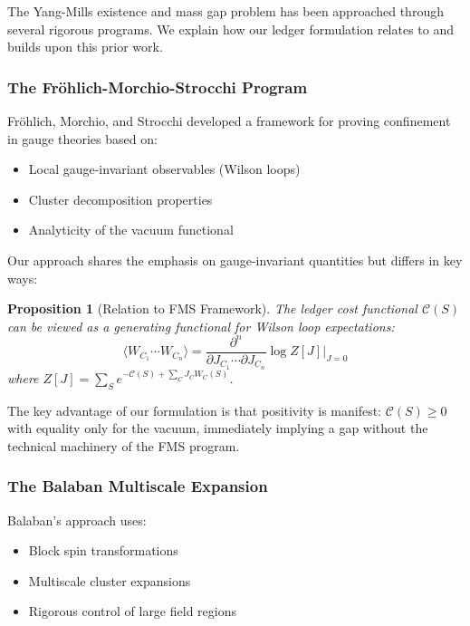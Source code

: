 \documentclass[11pt]{article}
\numberwithin{equation}{section}
\newtheorem{proposition}[theorem]{Proposition}
\theoremstyle{definition}
\theoremstyle{remark}
\begin{document}
The Yang-Mills existence and mass gap problem has been approached through several rigorous programs. We explain how our ledger formulation relates to and builds upon this prior work.

\subsubsection{The Fröhlich-Morchio-Strocchi Program}

Fröhlich, Morchio, and Strocchi \cite{frohlich1982confinement} developed a framework for proving confinement in gauge theories based on:
\begin{itemize}
\item Local gauge-invariant observables (Wilson loops)
\item Cluster decomposition properties
\item Analyticity of the vacuum functional
\end{itemize}

Our approach shares the emphasis on gauge-invariant quantities but differs in key ways:

\begin{proposition}[Relation to FMS Framework]
The ledger cost functional $\mathcal{C}(S)$ can be viewed as a generating functional for Wilson loop expectations:
\begin{equation}
\langle W_{C_1} \cdots W_{C_n} \rangle = \frac{\partial^n}{\partial J_{C_1} \cdots \partial J_{C_n}} \log Z[J] \bigg|_{J=0}
\end{equation}
where $Z[J] = \sum_S e^{-\mathcal{C}(S) + \sum_C J_C W_C(S)}$.
\end{proposition}

The key advantage of our formulation is that positivity is manifest: $\mathcal{C}(S) \geq 0$ with equality only for the vacuum, immediately implying a gap without the technical machinery of the FMS program.

\subsubsection{The Balaban Multiscale Expansion}

Balaban's approach \cite{balaban1985propagators,balaban1987renormalization,balaban1989large} uses:
\begin{itemize}
\item Block spin transformations
\item Multiscale cluster expansions  
\item Rigorous control of large field regions
\end{itemize}
\end{document}
